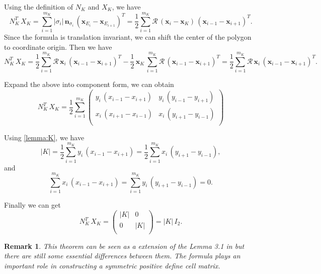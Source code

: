 \documentclass[times,review,preprint,authoryear]{elsarticle}
\newtheorem{remark}{Remark}
\newcommand{\bx}{\bm{x}}
\newcommand{\bn}{\bm{n}}
\begin{document}
Using the definition of $N_K$ and $X_K$, we have
\begin{equation*}
N_K^T \, X_K = \sum_{i=1}^{m_K} |\sigma_{i}| \, \bn_{\sigma_{i}} \, (\bx_{E_{i}} - \bx_{E_{i+1}})^T = \frac12 \sum_{i=1}^{m_K} \mathcal{R} \, (\bx_{i} - \bx_K) \, (\bx_{i-1} - \bx_{i+1})^T.
\end{equation*}
Since the formula is translation invariant, we can shift the center of the polygon to coordinate origin. Then we have
\begin{equation*}
N_K^T \, X_K = \frac12 \sum_{i=1}^{m_K} \mathcal{R} \, \bx_{i} \, (\bx_{i-1} - \bx_{i+1})^T - \frac12 \, \bx_K \, \sum_{i=1}^{m_K} \mathcal{R} \, (\bx_{i-1} - \bx_{i+1})^T = \frac12 \sum_{i=1}^{m_K} \mathcal{R} \, \bx_{i} \, (\bx_{i-1} - \bx_{i+1})^T.
\end{equation*}

Expand the above into component form, we can obtain
\begin{equation*}
N_K^T \, X_K = \frac12 \sum_{i=1}^{m_K} \left(\begin{matrix}
y_{i} \, (x_{i-1} - x_{i+1}) & y_{i} \, (y_{i-1} - y_{i+1}) \\
x_{i} \, (x_{i+1} - x_{i-1}) & x_{i} \, (y_{i+1} - y_{i-1}) \\
\end{matrix}\right)
\end{equation*}

Using \cref{lemma:K}, we have
\begin{equation*}
|K| = \frac12 \sum_{i=1}^{m_K} y_{i} \, (x_{i-1} - x_{i+1}) = \frac12 \sum_{i=1}^{m_K} x_{i} \, (y_{i+1} - y_{i-1}),
\end{equation*}
and
\begin{equation*}
\sum_{i=1}^{m_K} x_{i} \, (x_{i-1} - x_{i+1}) = \sum_{i=1}^{m_K} y_{i} \, (y_{i+1} - y_{i-1}) = 0.
\end{equation*}

Finally we can get
\begin{equation*}
N_K^T \, X_K = \left(\begin{matrix}
|K| & 0 \\
0 & |K| \\
\end{matrix}\right)
= |K| \, I_2.
\end{equation*}

\begin{remark}
This theorem can be seen as a extension of the Lemma 3.1 in \cite{wu_vertex-centered_2016} but there are still some essential differences between them. The formula plays an important role in constructing a symmetric positive define cell matrix.
\end{remark}
\end{document}
